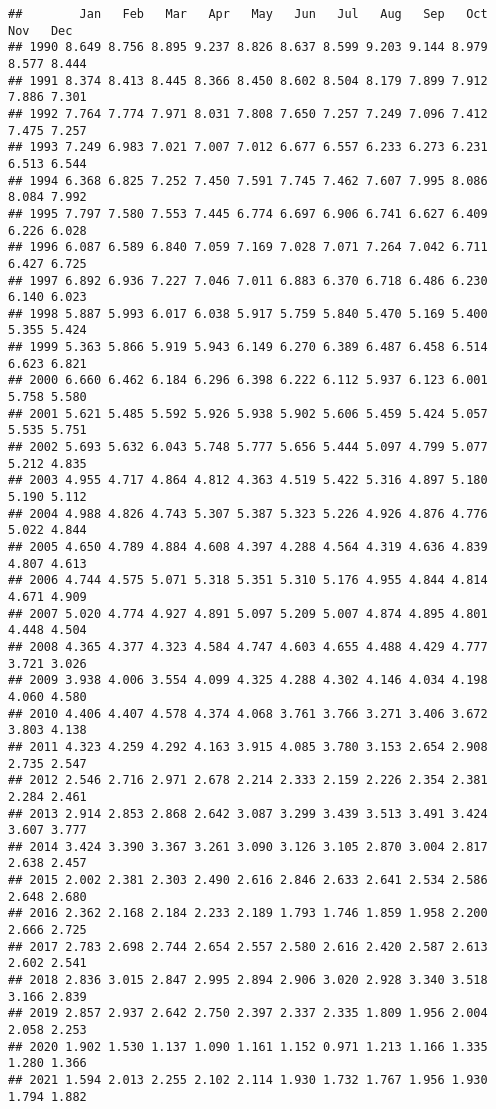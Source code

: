 \documentclass[
]{article}
\begin{document}
\begin{verbatim}
##        Jan   Feb   Mar   Apr   May   Jun   Jul   Aug   Sep   Oct   Nov   Dec
## 1990 8.649 8.756 8.895 9.237 8.826 8.637 8.599 9.203 9.144 8.979 8.577 8.444
## 1991 8.374 8.413 8.445 8.366 8.450 8.602 8.504 8.179 7.899 7.912 7.886 7.301
## 1992 7.764 7.774 7.971 8.031 7.808 7.650 7.257 7.249 7.096 7.412 7.475 7.257
## 1993 7.249 6.983 7.021 7.007 7.012 6.677 6.557 6.233 6.273 6.231 6.513 6.544
## 1994 6.368 6.825 7.252 7.450 7.591 7.745 7.462 7.607 7.995 8.086 8.084 7.992
## 1995 7.797 7.580 7.553 7.445 6.774 6.697 6.906 6.741 6.627 6.409 6.226 6.028
## 1996 6.087 6.589 6.840 7.059 7.169 7.028 7.071 7.264 7.042 6.711 6.427 6.725
## 1997 6.892 6.936 7.227 7.046 7.011 6.883 6.370 6.718 6.486 6.230 6.140 6.023
## 1998 5.887 5.993 6.017 6.038 5.917 5.759 5.840 5.470 5.169 5.400 5.355 5.424
## 1999 5.363 5.866 5.919 5.943 6.149 6.270 6.389 6.487 6.458 6.514 6.623 6.821
## 2000 6.660 6.462 6.184 6.296 6.398 6.222 6.112 5.937 6.123 6.001 5.758 5.580
## 2001 5.621 5.485 5.592 5.926 5.938 5.902 5.606 5.459 5.424 5.057 5.535 5.751
## 2002 5.693 5.632 6.043 5.748 5.777 5.656 5.444 5.097 4.799 5.077 5.212 4.835
## 2003 4.955 4.717 4.864 4.812 4.363 4.519 5.422 5.316 4.897 5.180 5.190 5.112
## 2004 4.988 4.826 4.743 5.307 5.387 5.323 5.226 4.926 4.876 4.776 5.022 4.844
## 2005 4.650 4.789 4.884 4.608 4.397 4.288 4.564 4.319 4.636 4.839 4.807 4.613
## 2006 4.744 4.575 5.071 5.318 5.351 5.310 5.176 4.955 4.844 4.814 4.671 4.909
## 2007 5.020 4.774 4.927 4.891 5.097 5.209 5.007 4.874 4.895 4.801 4.448 4.504
## 2008 4.365 4.377 4.323 4.584 4.747 4.603 4.655 4.488 4.429 4.777 3.721 3.026
## 2009 3.938 4.006 3.554 4.099 4.325 4.288 4.302 4.146 4.034 4.198 4.060 4.580
## 2010 4.406 4.407 4.578 4.374 4.068 3.761 3.766 3.271 3.406 3.672 3.803 4.138
## 2011 4.323 4.259 4.292 4.163 3.915 4.085 3.780 3.153 2.654 2.908 2.735 2.547
## 2012 2.546 2.716 2.971 2.678 2.214 2.333 2.159 2.226 2.354 2.381 2.284 2.461
## 2013 2.914 2.853 2.868 2.642 3.087 3.299 3.439 3.513 3.491 3.424 3.607 3.777
## 2014 3.424 3.390 3.367 3.261 3.090 3.126 3.105 2.870 3.004 2.817 2.638 2.457
## 2015 2.002 2.381 2.303 2.490 2.616 2.846 2.633 2.641 2.534 2.586 2.648 2.680
## 2016 2.362 2.168 2.184 2.233 2.189 1.793 1.746 1.859 1.958 2.200 2.666 2.725
## 2017 2.783 2.698 2.744 2.654 2.557 2.580 2.616 2.420 2.587 2.613 2.602 2.541
## 2018 2.836 3.015 2.847 2.995 2.894 2.906 3.020 2.928 3.340 3.518 3.166 2.839
## 2019 2.857 2.937 2.642 2.750 2.397 2.337 2.335 1.809 1.956 2.004 2.058 2.253
## 2020 1.902 1.530 1.137 1.090 1.161 1.152 0.971 1.213 1.166 1.335 1.280 1.366
## 2021 1.594 2.013 2.255 2.102 2.114 1.930 1.732 1.767 1.956 1.930 1.794 1.882
\end{verbatim}
\end{document}
